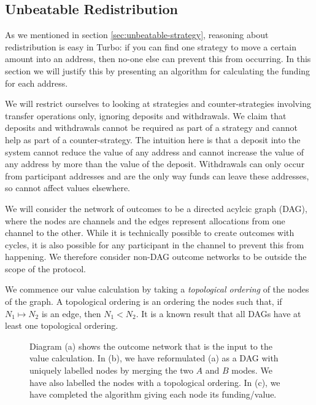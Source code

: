 \subsection{Unbeatable Redistribution}

As we mentioned in section \ref{sec:unbeatable-strategy}, reasoning about redistribution is easy in Turbo: if you can find one strategy to move a certain amount into an address, then no-one else can prevent this from occurring.
In this section we will justify this by presenting an algorithm for calculating the funding for each address.

We will restrict ourselves to looking at strategies and counter-strategies involving transfer operations only, ignoring deposits and withdrawals.
We claim that deposits and withdrawals cannot be required as part of a strategy and cannot help as part of a counter-strategy.
The intuition here is that a deposit into the system cannot reduce the value of any address and cannot increase the value of any address by more than the value of the deposit.
Withdrawals can only occur from participant addresses and are the only way funds can leave these addresses, so cannot affect values elsewhere.

We will consider the network of outcomes to be a directed acylcic graph (DAG), where the nodes are channels and the edges represent allocations from one channel to the other.
While it is technically possible to create outcomes with cycles, it is also possible for any participant in the channel to prevent this from happening.
We therefore consider non-DAG outcome networks to be outside the scope of the protocol.

We commence our value calculation by taking a \textit{topological ordering} of the nodes of the graph.
A topological ordering is an ordering the nodes such that, if $N_1 \mapsto N_2$ is an edge, then $N_1 < N_2$.
It is a known result that all DAGs have at least one topological ordering.

\begin{figure}[h]\centering
  \makebox[\textwidth][c]{}
  \caption{
    Diagram (a) shows the outcome network that is the input to the value calculation.
    In (b), we have reformulated (a) as a DAG with uniquely labelled nodes by merging the two $A$ and $B$ modes.
    We have also labelled the nodes with a topological ordering.
    In (c), we have completed the algorithm giving each node its funding/value.
  }\label{fig:turbo-redistribution}
\end{figure}

